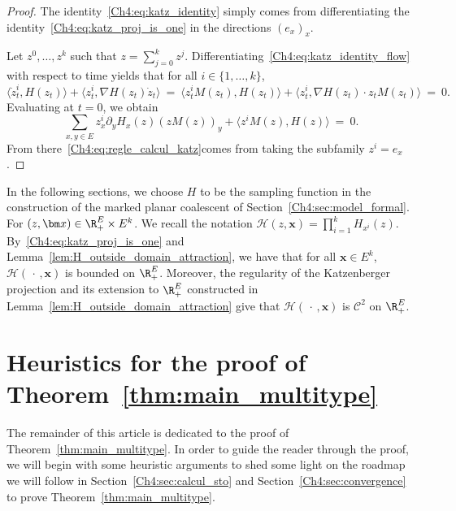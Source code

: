 \begin{refsegment}
\begin{lem}{\cite[Lemma~12]{Julie_Zsofia}}
\end{lem}
\begin{proof}
The identity~\eqref{Ch4:eq:katz_identity} simply comes from differentiating the identity~\eqref{Ch4:eq:katz_proj_is_one} 
in the directions $(e_x)_x$. 

Let $z^0,\ldots, z^k$ such that $z=\sum_{j=0}^k z^j$. Differentiating~\eqref{Ch4:eq:katz_identity_flow} with respect to time yields that
for all $i\in\{1,\ldots, k\}$,
\[
\langle \dot{z}^i_t, H(z_t)\rangle + \langle z^i_t, \nabla H(z_t)\dot{z}_t\rangle \ =\ \langle z^i_t M(z_t), H(z_t)\rangle + \langle z^i_t, \nabla H(z_t)\cdot z_tM(z_t)\rangle\ =\ 0.
\]
Evaluating at $t=0$, we obtain
\[
\sum_{x,y\in E}z^i_x \partial_y H_x(z) (zM(z))_y + \langle z^i M(z), H(z)\rangle\ =\ 0.
\]
From there~\eqref{Ch4:eq:regle_calcul_katz}comes from taking the subfamily $z^i=e_x$.
\end{proof}


In the following sections, we choose $H$ to be the sampling function in the construction of the marked planar coalescent of Section~\ref{Ch4:sec:model_formal}.
For $(z,\bm x)\in\R_+^E\times E^k$. We recall the notation $\mathcal{H}(z,\bm x)=\prod_{i=1}^k H_{x^i}(z)$.
By~\eqref{Ch4:eq:katz_proj_is_one} and Lemma~\ref{lem:H_outside_domain_attraction}, we have that for all $\bm x\in E^k$,
$\mathcal{H}(\,\cdot\, ,\bm x)$ is bounded on $\R_+^E$. Moreover, the regularity of the Katzenberger projection and its extension to $\R_+^E$ constructed in Lemma~\ref{lem:H_outside_domain_attraction} give that $\mathcal{H}(\,\cdot\, , \bm x)$ is $\mathcal{C}^2$ on $\R_+^E$. 

\section{Heuristics for the proof of Theorem~\ref{thm:main_multitype}}\label{Ch4:sec:heuristics}
The remainder of this article is dedicated to the proof of Theorem~\ref{thm:main_multitype}.
In order to guide the reader through the proof, we will begin with some heuristic arguments to shed some light on the roadmap we will follow in Section~\ref{Ch4:sec:calcul_sto} and Section~\ref{Ch4:sec:convergence} to prove Theorem~\ref{thm:main_multitype}.

\end{refsegment}
